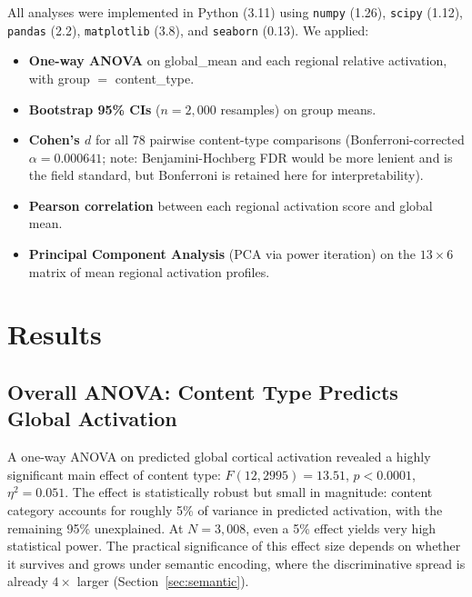\documentclass[11pt,letterpaper]{article}
\begin{document}
All analyses were implemented in Python (3.11) using \texttt{numpy} (1.26), \texttt{scipy} (1.12), \texttt{pandas} (2.2), \texttt{matplotlib} (3.8), and \texttt{seaborn} (0.13). We applied:

\begin{itemize}[leftmargin=1.4em,itemsep=2pt,topsep=2pt]
\item \textbf{One-way ANOVA} on global\_mean and each regional relative activation, with group $=$ content\_type.
\item \textbf{Bootstrap 95\% CIs} ($n = 2{,}000$ resamples) on group means.
\item \textbf{Cohen's $d$} for all 78 pairwise content-type comparisons (Bonferroni-corrected $\alpha = 0.000641$; note: Benjamini-Hochberg FDR would be more lenient and is the field standard, but Bonferroni is retained here for interpretability).
\item \textbf{Pearson correlation} between each regional activation score and global mean.
\item \textbf{Principal Component Analysis} (PCA via power iteration) on the $13 \times 6$ matrix of mean regional activation profiles.
\end{itemize}

\FloatBarrier
\clearpage
\section{Results}\label{sec:results}

\subsection{Overall ANOVA: Content Type Predicts Global Activation}

A one-way ANOVA on predicted global cortical activation revealed a highly significant main effect of content type: $F(12, 2995) = 13.51$, $p < 0.0001$, $\eta^2 = 0.051$. The effect is statistically robust but small in magnitude: content category accounts for roughly 5\% of variance in predicted activation, with the remaining 95\% unexplained. At $N = 3{,}008$, even a 5\% effect yields very high statistical power. The practical significance of this effect size depends on whether it survives and grows under semantic encoding, where the discriminative spread is already $4\times$ larger (Section~\ref{sec:semantic}).
\end{document}
